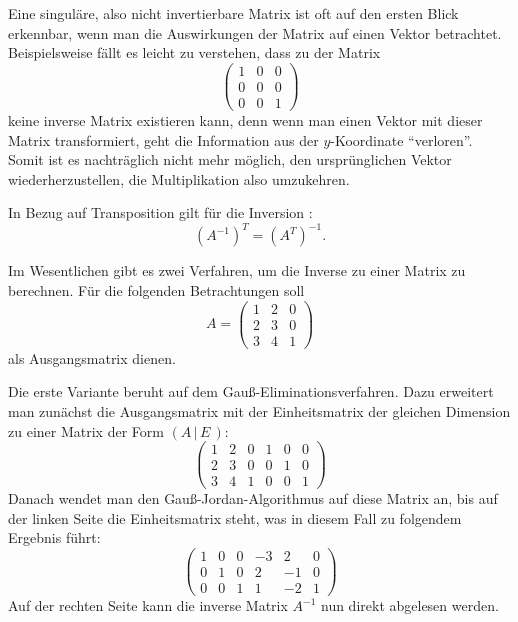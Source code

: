 Eine singuläre, also nicht invertierbare Matrix ist oft auf den ersten Blick erkennbar, wenn man die Auswirkungen der Matrix auf einen Vektor betrachtet. Beispielsweise fällt es leicht zu verstehen, dass zu der Matrix
\begin{equation}
 \begin{pmatrix}
  1 & 0 & 0 \\
  0 & 0 & 0 \\
  0 & 0 & 1
 \end{pmatrix}
\end{equation}
keine inverse Matrix existieren kann, denn wenn man einen Vektor mit dieser Matrix transformiert, geht die Information aus der $y$-Koordinate \enquote{verloren}. Somit ist es nachträglich nicht mehr möglich, den ursprünglichen Vektor wiederherzustellen, die Multiplikation also umzukehren.

In Bezug auf Transposition gilt für die Inversion :
\begin{equation}
 (A^{-1})^T = (A^T)^{-1}.
\end{equation}

Im Wesentlichen gibt es zwei Verfahren, um die Inverse zu einer Matrix zu berechnen. Für die folgenden Betrachtungen soll
\begin{equation*}
 A = \begin{pmatrix}
  1 & 2 & 0 \\
  2 & 3 & 0 \\
  3 & 4 & 1
 \end{pmatrix}
\end{equation*}
als Ausgangsmatrix dienen.

Die erste Variante beruht auf dem Gauß-Eliminationsverfahren. Dazu erweitert man zunächst die Ausgangsmatrix mit der Einheitsmatrix der gleichen Dimension zu einer Matrix der Form $\left( A \, | \, E \, \right)$:
\begin{equation}
 \left(\begin{array}{ccc|ccc}
    1 & 2 & 0 &  1 & 0 & 0 \\
    2 & 3 & 0 &  0 & 1 & 0 \\
    3 & 4 & 1 &  0 & 0 & 1
  \end{array}\right)
\end{equation}
Danach wendet man den Gauß-Jordan-Algorithmus auf diese Matrix an, bis auf der linken Seite die Einheitsmatrix steht, was in diesem Fall zu folgendem Ergebnis führt:
\begin{equation}
  \left(\begin{array}{ccc|ccc}
    1 & 0 & 0  & -3 & 2 & 0 \\
    0 & 1 & 0  & 2 & -1 & 0 \\
    0 & 0 & 1  & 1 & -2 & 1
  \end{array}\right)
\end{equation}
Auf der rechten Seite kann die inverse Matrix $A^{-1}$ nun direkt abgelesen werden.

